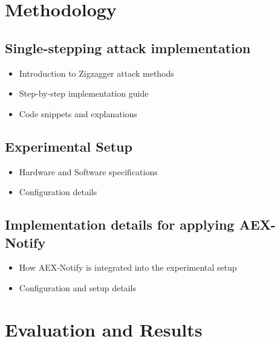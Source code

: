 \documentclass{llncs}
\begin{document}
\section{Methodology}

\subsection{Single-stepping attack implementation}
\begin{itemize}
  \item Introduction to Zigzagger attack methods
  \item Step-by-step implementation guide
  \item Code snippets and explanations
\end{itemize}

\subsection{Experimental Setup}
\begin{itemize}
  \item Hardware and Software specifications
  \item Configuration details
\end{itemize}

\subsection{Implementation details for applying AEX-Notify}
\begin{itemize}
  \item How AEX-Notify is integrated into the experimental setup
  \item Configuration and setup details
\end{itemize}



\section{Evaluation and Results}
\end{document}
